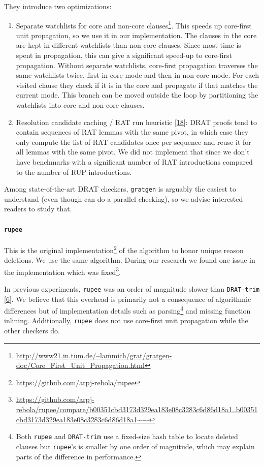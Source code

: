 \documentclass[
]{report}
\begin{document}
They introduce two optimizations:

\begin{enumerate}
\def\labelenumi{\arabic{enumi}.}
\item
  Separate watchlists for core and non-core clauses\footnote{\url{http://www21.in.tum.de/~lammich/grat/gratgen-doc/Core_First_Unit_Propagation.html}}.
  This speeds up core-first unit propagation, so we use it in our
  implementation. The clauses in the core are kept in different
  watchlists than non-core clauses. Since most time is spent in
  propagation, this can give a significant speed-up to core-first
  propagation. Without separate watchlists, core-first propagation
  traverses the same watchlists twice, first in core-mode and then in
  non-core-mode. For each visited clause they check if it is in the core
  and propagate if that matches the current mode. This branch can be
  moved outside the loop by partitioning the watchlists into core and
  non-core clauses.
\item
  Resolution candidate caching / RAT run heuristic
  {[}\protect\hyperlink{ref-lammich2017efficient}{18}{]}: DRAT proofs
  tend to contain sequences of RAT lemmas with the same pivot, in which
  case they only compute the list of RAT candidates once per sequence
  and reuse it for all lemmas with the same pivot. We did not implement
  that since we don't have benchmarks with a significant number of RAT
  introductions compared to the number of RUP introductions.
\end{enumerate}

Among state-of-the-art DRAT checkers, \texttt{gratgen} is arguably the
easiest to understand (even though can do a parallel checking), so we
advise interested readers to study that.

\paragraph{\texttt{rupee}}

This is the original implementation\footnote{\url{https://github.com/arpj-rebola/rupee}}
of the algorithm to honor unique reason deletions. We use the same
algorithm. During our research we found one issue in the implementation
which was fixed\footnote{\url{https://github.com/arpj-rebola/rupee/compare/b00351cbd3173d329ea183e08c3283c6d86d18a1..b00351cbd3173d329ea183e08c3283c6d86d18a1~~~}}.

In previous experiments, \texttt{rupee} was an order of magnitude slower
than \texttt{DRAT-trim} {[}\protect\hyperlink{ref-RebolaCruz2018}{6}{]}.
We believe that this overhead is primarily not a consequence of
algorithmic differences but of implementation details such as
parsing\footnote{Both \texttt{rupee} and \texttt{DRAT-trim} use a
  fixed-size hash table to locate deleted clauses but \texttt{rupee}'s
  is smaller by one order of magnitude, which may explain parts of the
  difference in performance.} and missing function inlining.
Additionally, \texttt{rupee} does not use core-first unit propagation
while the other checkers do.
\end{document}

